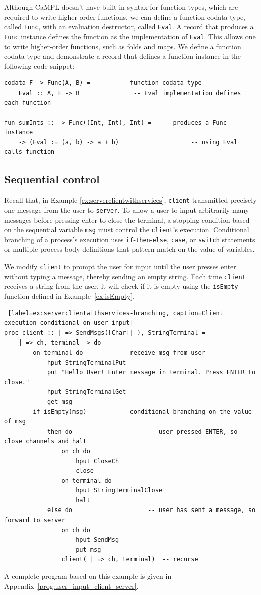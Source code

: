 \documentclass[acmsmall]{acmart}
\begin{document}
Although CaMPL doesn't have built-in syntax for function types, which are required to write higher-order functions, we can define a function codata type, called \lstinline{Func}, with an evaluation destructor, called \lstinline{Eval}.
A record that produces a \lstinline{Func} instance defines the function as the implementation of \lstinline{Eval}.
This allows one to write higher-order functions, such as folds and maps.
We define a function codata type and demonstrate a record that defines a function instance in the following code snippet:
\begin{lstlisting}
codata F -> Func(A, B) =		-- function codata type
	Eval :: A, F -> B 				-- Eval implementation defines each function

fun sumInts :: -> Func((Int, Int), Int) =	-- produces a Func instance
    -> (Eval := (a, b) -> a + b)					-- using Eval calls function
\end{lstlisting}


\subsection{Sequential control}
\label{sec:seqcontrol}

Recall that, in Example \ref{ex:serverclientwithservices}, \lstinline$client$  transmitted precisely one message from the user to \lstinline$server$.
To allow a user to input arbitrarily many messages before pressing enter to close the terminal, a stopping condition based on the sequential variable \lstinline{msg} must control the \lstinline$client$'s execution.
Conditional branching of a process's execution uses \lstinline$if$-\lstinline$then$-\lstinline$else$, \lstinline$case$, or \lstinline$switch$ statements or multiple process body definitions that pattern match on the value of variables. 

We modify \lstinline$client$ to prompt the user for input until the user presses enter without typing a message, thereby sending an empty string.
Each time \lstinline$client$ receives a string from the user, it will check if it is empty using the \lstinline$isEmpty$ function defined in Example~\ref{ex:isEmpty}.
\begin{lstlisting} [label=ex:serverclientwithservices-branching, caption=Client execution conditional on user input] 
proc client :: | => SendMsgs([Char]| ), StringTerminal =
	| => ch, terminal -> do
		on terminal do			-- receive msg from user
			hput StringTerminalPut
			put "Hello User! Enter message in terminal. Press ENTER to close."
			hput StringTerminalGet
			get msg
		if isEmpty(msg)			-- conditional branching on the value of msg
			then do						-- user pressed ENTER, so close channels and halt
				on ch do 
					hput CloseCh
					close 
				on terminal do
					hput StringTerminalClose	
					halt 
			else do						-- user has sent a message, so forward to server
				on ch do											
					hput SendMsg
					put msg
				client( | => ch, terminal)	-- recurse 
\end{lstlisting}   
A complete program based on this example is given in Appendix~\ref{prog:user_input_client_server}.
\end{document}
